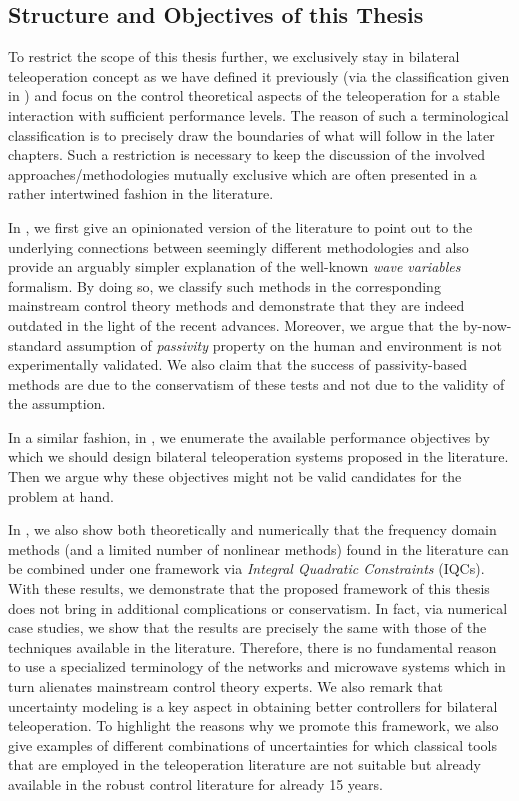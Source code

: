 \subsection{Structure and Objectives of this Thesis}
To restrict the scope of this thesis further, we exclusively stay in bilateral teleoperation concept as we have defined it previously (via 
the classification given in ) and focus on the control theoretical aspects of the teleoperation for a stable 
interaction with sufficient performance levels. The reason of such a terminological classification is to precisely draw the boundaries of 
what will follow in the later chapters. Such a restriction is necessary to keep the discussion of the involved approaches/methodologies 
mutually exclusive which are often presented in a rather intertwined fashion in the literature.

In , we first give an opinionated version of the literature to point out to the underlying connections between 
seemingly different methodologies and also provide an arguably simpler explanation of the well-known \emph{wave variables} formalism. By 
doing so, we classify such methods in the corresponding mainstream control theory methods and demonstrate that they are indeed outdated in 
the light of the recent advances. Moreover, we argue that the by-now-standard assumption of \emph{passivity} property on the human and 
environment is not experimentally validated. We also claim that the success of passivity-based methods are due to the conservatism 
of these tests and not due to the validity of the assumption.

In a similar fashion, in , we enumerate the available performance objectives by which we should design bilateral 
teleoperation systems proposed in the literature. Then we argue why these objectives might not be valid candidates for the problem at hand.

In , we also show both theoretically and numerically that the frequency domain methods (and a limited number of 
nonlinear methods) found in the literature can be combined under one framework via \emph{Integral Quadratic Constraints} (IQCs). With these 
results, we demonstrate that the proposed framework of this thesis does not bring in additional complications or conservatism. In fact, 
via numerical case studies, we show that the results are precisely the same with those of the techniques available in the literature.
Therefore, there is no fundamental reason to use a specialized terminology of the networks and microwave systems which in turn alienates 
mainstream control theory experts. We also remark that uncertainty modeling is a key aspect in obtaining better controllers for bilateral 
teleoperation. To highlight the reasons why we promote this framework, we also give examples of different combinations of uncertainties 
for which classical tools that are employed in the teleoperation literature are not suitable but already available in the robust control 
literature for already 15 years. 


